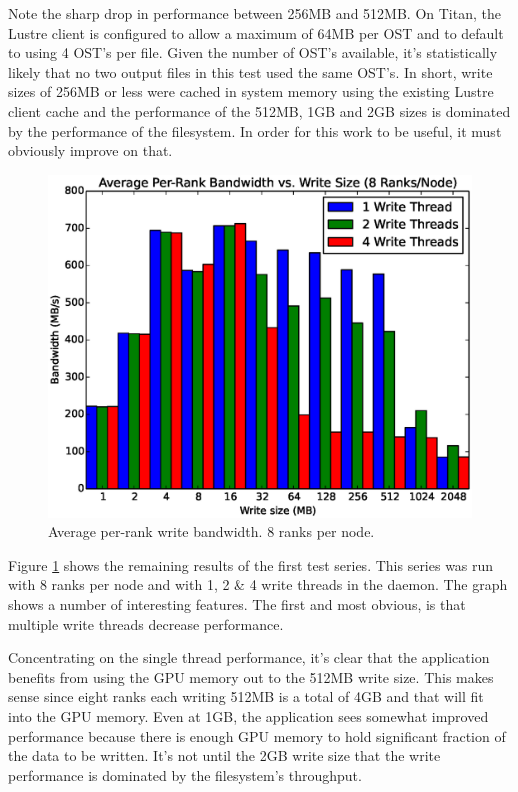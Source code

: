 Note the sharp drop in performance between 256MB and 512MB.  On Titan, the Lustre client is configured to allow a maximum of 64MB per OST and to default to using 4 OST's per file.  Given the number of OST's available, it's statistically likely that no two output files in this test used the same OST's.  In short, write sizes of 256MB or less were cached in system memory using the existing Lustre client cache and the performance of the 512MB, 1GB and 2GB sizes is dominated by the performance of the filesystem.  In order for this work to be useful, it must obviously improve on that.

\begin{figure}
\includegraphics[width=\linewidth]{figures/figure_2.eps}
\caption{Average per-rank write bandwidth.  8 ranks per node.} 
\label{fig:results_8_nobars}
\end{figure}

Figure \ref{fig:results_8_nobars} shows the remaining results of the first test series.  This series was run with 8 ranks per node and with 1, 2 \& 4 write threads in the daemon.  The graph shows a number of interesting features.  The first and most obvious, is that multiple write threads decrease performance.

Concentrating on the single thread performance, it's clear that the application benefits from using the GPU memory out to the 512MB write size.  This makes sense since eight ranks each writing 512MB is a total of 4GB and that will fit into the GPU memory.  Even at 1GB, the application sees somewhat improved performance because there is enough GPU memory to hold significant fraction of the data to be written.  It's not until the 2GB write size that the write performance is dominated by the filesystem's throughput.


